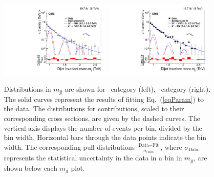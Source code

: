 \begin{figure}[th!b]
\begin{center}
\includegraphics[width=0.49\textwidth]{EXO-14-009/HbbZqqfigs/FITS/HbbVqqFitAndPullHighP.pdf}
\includegraphics[width=0.49\textwidth]{EXO-14-009/HbbZqqfigs/FITS/HbbVqqFitAndPullLowP.pdf}
\end{center}
\caption{Distributions in $m_\mathrm{jj}$ are shown for
   \HbbHP\ category (left), \HbbLP\ category (right).
    The solid curves represent the
   results of fitting Eq.~(\ref{eqParam}) to the data. The
   distributions for \HbbVqq
   contributions, scaled to their corresponding cross sections, are
   given by the dashed curves. 
   The vertical axis displays the number of events per bin, divided 
   by the bin width. 
   Horizontal bars
   through the data points indicate the bin width. 
   The corresponding pull
   distributions
   $\frac{\text{Data}-\text{Fit}}{\sigma_{\text{Data}}}$, where
   $\sigma_{\text{Data}}$ represents the statistical uncertainty in
   the data in a bin in $m_\mathrm{jj}$, are shown below each
   $m_\mathrm{jj}$ plot.}
\label{fig:HbbZqqBG}
\end{figure}


